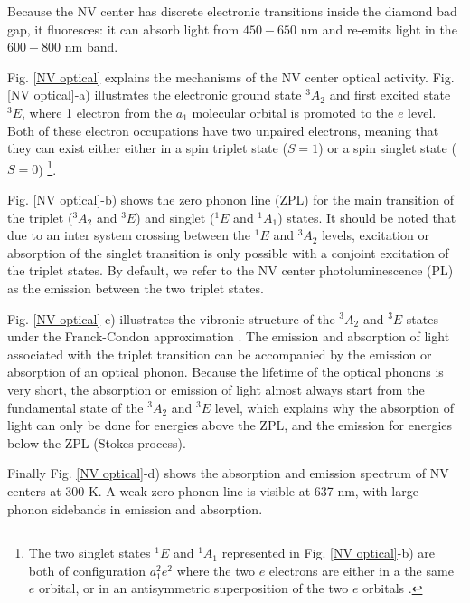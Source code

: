 \documentclass[a4paper,11pt]{report}
\begin{document}
Because the NV center has discrete electronic transitions inside the diamond bad gap, it fluoresces: it can absorb light from $450-650$ nm and re-emits light in the $600-800$ nm band.

Fig. \ref{NV optical} explains the mechanisms of the NV center optical activity. Fig. \ref{NV optical}-a) illustrates the electronic ground state $^3A_2$ and first excited state $^3E$, where 1 electron from the $a_1$ molecular orbital is promoted to the $e$ level. Both of these electron occupations have two unpaired electrons, meaning that they can exist either either in a spin triplet state ($S=1$) or a spin singlet state ($S=0$) \footnote{The two singlet states $^1E$ and $^1A_1$ represented in Fig. \ref{NV optical}-b) are both of configuration $a_1^2e^2$ where the two $e$ electrons are either in a the same $e$ orbital, or in an antisymmetric superposition of the two $e$ orbitals \citep{doherty2011negatively}.}. 

Fig. \ref{NV optical}-b) shows the zero phonon line (ZPL) for the main transition of the triplet ($^3A_2$ and $^3E$) and singlet ($^1E$ and $^1A_1$) states. It should be noted that due to an inter system crossing between the $^1E$ and $^3A_2$ levels, excitation or absorption of the singlet transition is only possible with a conjoint excitation of the triplet states. By default, we refer to the NV center photoluminescence (PL) as the emission between the two triplet states.

Fig. \ref{NV optical}-c) illustrates the vibronic structure of the $^3A_2$ and $^3E$ states under the Franck-Condon approximation \citep{gali2011time}. The emission and absorption of light associated with the triplet transition can be accompanied by the emission or absorption of an optical phonon. Because the lifetime of the optical phonons is very short, the absorption or emission of light almost always start from the fundamental state of the $^3A_2$ and $^3E$ level, which explains why the absorption of light can only be done for energies above the ZPL, and the emission for energies below the ZPL (Stokes process).

Finally Fig. \ref{NV optical}-d) shows the absorption and emission spectrum of NV centers at 300 K. A weak zero-phonon-line is visible at 637 nm, with large phonon sidebands in emission and absorption.
\end{document}
